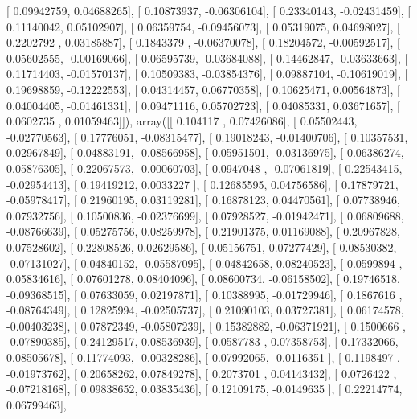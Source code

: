 \documentclass{article}
\begin{document}
       [ 0.09942759,  0.04688265],
       [ 0.10873937, -0.06306104],
       [ 0.23340143, -0.02431459],
       [ 0.11140042,  0.05102907],
       [ 0.06359754, -0.09456073],
       [ 0.05319075,  0.04698027],
       [ 0.2202792 ,  0.03185887],
       [ 0.1843379 , -0.06370078],
       [ 0.18204572, -0.00592517],
       [ 0.05602555, -0.00169066],
       [ 0.06595739, -0.03684088],
       [ 0.14462847, -0.03633663],
       [ 0.11714403, -0.01570137],
       [ 0.10509383, -0.03854376],
       [ 0.09887104, -0.10619019],
       [ 0.19698859, -0.12222553],
       [ 0.04314457,  0.06770358],
       [ 0.10625471,  0.00564873],
       [ 0.04004405, -0.01461331],
       [ 0.09471116,  0.05702723],
       [ 0.04085331,  0.03671657],
       [ 0.0602735 ,  0.01059463]]), array([[ 0.104117  ,  0.07426086],
       [ 0.05502443, -0.02770563],
       [ 0.17776051, -0.08315477],
       [ 0.19018243, -0.01400706],
       [ 0.10357531,  0.02967849],
       [ 0.04883191, -0.08566958],
       [ 0.05951501, -0.03136975],
       [ 0.06386274,  0.05876305],
       [ 0.22067573, -0.00060703],
       [ 0.0947048 , -0.07061819],
       [ 0.22543415, -0.02954413],
       [ 0.19419212,  0.0033227 ],
       [ 0.12685595,  0.04756586],
       [ 0.17879721, -0.05978417],
       [ 0.21960195,  0.03119281],
       [ 0.16878123,  0.04470561],
       [ 0.07738946,  0.07932756],
       [ 0.10500836, -0.02376699],
       [ 0.07928527, -0.01942471],
       [ 0.06809688, -0.08766639],
       [ 0.05275756,  0.08259978],
       [ 0.21901375,  0.01169088],
       [ 0.20967828,  0.07528602],
       [ 0.22808526,  0.02629586],
       [ 0.05156751,  0.07277429],
       [ 0.08530382, -0.07131027],
       [ 0.04840152, -0.05587095],
       [ 0.04842658,  0.08240523],
       [ 0.0599894 ,  0.05834616],
       [ 0.07601278,  0.08404096],
       [ 0.08600734, -0.06158502],
       [ 0.19746518, -0.09368515],
       [ 0.07633059,  0.02197871],
       [ 0.10388995, -0.01729946],
       [ 0.1867616 , -0.08764349],
       [ 0.12825994, -0.02505737],
       [ 0.21090103,  0.03727381],
       [ 0.06174578, -0.00403238],
       [ 0.07872349, -0.05807239],
       [ 0.15382882, -0.06371921],
       [ 0.1500666 , -0.07890385],
       [ 0.24129517,  0.08536939],
       [ 0.0587783 ,  0.07358753],
       [ 0.17332066,  0.08505678],
       [ 0.11774093, -0.00328286],
       [ 0.07992065, -0.0116351 ],
       [ 0.1198497 , -0.01973762],
       [ 0.20658262,  0.07849278],
       [ 0.2073701 ,  0.04143432],
       [ 0.0726422 , -0.07218168],
       [ 0.09838652,  0.03835436],
       [ 0.12109175, -0.0149635 ],
       [ 0.22214774,  0.06799463],
\end{document}

